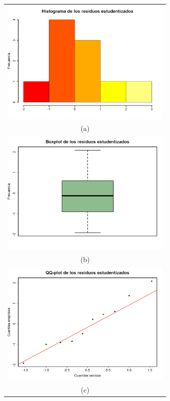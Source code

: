 \begin{ejemplo}
\begin{figure}[htbp]
\begin{center}
\begin{enColor}
\begin{tabular}{c}
\includegraphics[height=6cm]{../fig/Cap10-EjemploAnalisisResiduos01.png}\\
(a)\\
\includegraphics[height=6cm]{../fig/Cap10-EjemploAnalisisResiduos02.png}\\
(b)\\
\includegraphics[height=6cm]{../fig/Cap10-EjemploAnalisisResiduos03.png}\\
(c)
\end{tabular}
\end{enColor}
\begin{bn}

\end{bn}
\end{center}
\end{figure}
\end{ejemplo}
